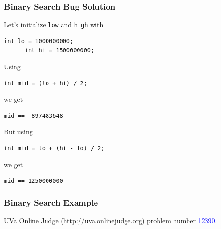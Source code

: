 \documentclass{beamer}
\newcommand{\uvalink}[2]{UVa Online Judge (http://uva.onlinejudge.org)
  problem number \href{#2}{\textcolor{blue}{#1}.}}
\begin{document}
\begin{frame}[fragile]
\frametitle{Binary Search Bug Solution}

\footnotesize


Let's initialize \texttt{low} and \texttt{high} with
\begin{lstlisting}[frame=none]
      int lo = 1000000000;
      int hi = 1500000000;
\end{lstlisting}


Using

\begin{lstlisting}[frame=none]
      int mid = (lo + hi) / 2;
\end{lstlisting}

we get

\begin{lstlisting}[frame=none]
      mid == -897483648
\end{lstlisting}


But using

\begin{lstlisting}[frame=none]
      int mid = lo + (hi - lo) / 2;
\end{lstlisting}

we get

\begin{lstlisting}[frame=none]
      mid == 1250000000
\end{lstlisting}

\end{frame}

\fi



\begin{frame}%
\frametitle{Binary Search Example}
\label{slide:binary_search_example}

\uvalink{12390}{https://uva.onlinejudge.org/index.php?option=onlinejudge&page=show_problem&problem=3812}

\end{frame}


\ifanswers
\end{document}
